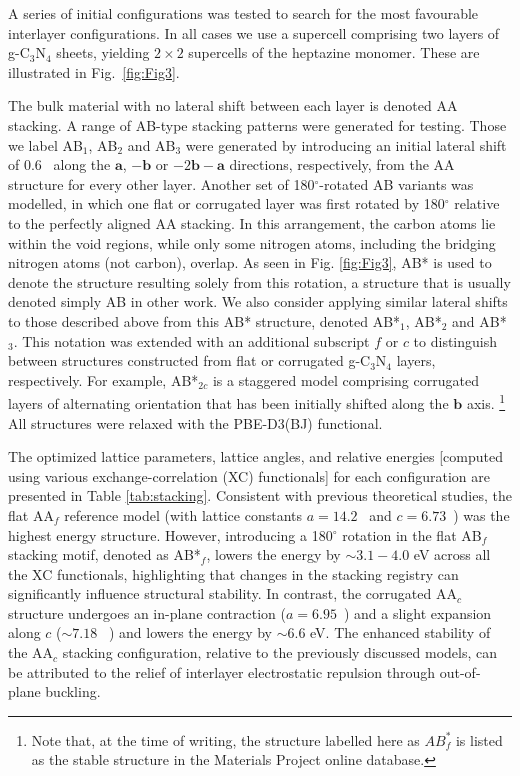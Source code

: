 A series of initial configurations was tested to search for the most favourable
interlayer configurations.  In all cases we use a supercell comprising two layers of g-C$_3$N$_4$ sheets, yielding $2 \times 2$ supercells of the heptazine monomer.  These are illustrated in Fig.\ \ref{fig:Fig3}.

The bulk material with no lateral shift between each layer is denoted AA stacking.
A range of AB-type stacking patterns were generated for testing. Those we label AB$_{1}$, AB$_{2}$ and AB$_{3}$ were generated by introducing an initial lateral shift of 0.6~\text{\AA} along the $\mathbf{a}$, $-\mathbf{b}$ or $-2\mathbf{b}-\mathbf{a}$
directions, respectively, from the AA structure for every other layer.
Another set of 180$^\circ$-rotated AB variants was modelled, in which one flat or corrugated layer was first rotated by 180$^\circ$ relative to the perfectly aligned AA stacking. In this arrangement, the carbon atoms lie within the void regions, while only some nitrogen atoms, including the bridging nitrogen atoms (not carbon), overlap. As seen in Fig. \ref{fig:Fig3}, AB* is used to denote the structure resulting solely from this rotation, a structure that is usually denoted simply AB in other work.
We also consider applying similar lateral shifts to those described above from this AB* structure, denoted AB*$_{1}$, AB*$_{2}$ and AB*$_{3}$. This notation was extended with an additional 
subscript $f$ or $c$ to distinguish between structures constructed from flat or corrugated g-C$_3$N$_4$ layers, respectively. For example, AB*$_{2c}$ is a staggered model comprising corrugated layers of alternating orientation that has been initially shifted along the $\mathbf{b}$ axis.%
\footnote{Note that, at the time of writing, the structure labelled here as $AB^*_f$ is listed as the stable structure in the Materials Project online database.}
All structures were relaxed with the PBE-D3(BJ) functional.

The optimized lattice parameters, lattice angles, and relative energies [computed using various exchange-correlation (XC) functionals] for each configuration are presented in Table \ref{tab:stacking}. 
Consistent with previous theoretical studies, \cite{Sun2018FirstArrangement,Zuluaga2015StructuralG-C3N4}
the flat AA$_f$ reference model (with lattice constants $a = 14.2$~\text{\AA} and $c = 6.73$~\text{\AA}) was the highest energy structure. 
However, introducing a 180$^\circ$ rotation in the flat AB$_f$ stacking motif, denoted as AB*$_f$, lowers the energy by $\sim3.1-4.0$ eV across all the XC functionals, highlighting that changes in the stacking registry can significantly influence structural stability. In contrast, the corrugated AA$_c$ structure undergoes an in-plane contraction ($a = 6.95$~\text{\AA}) and a slight expansion along $c$ ($\sim7.18$ ~\text{\AA}) and lowers the energy by $\sim6.6$ eV. The enhanced stability of the AA$_c$ stacking configuration, relative to the previously discussed models, can be attributed to the relief of interlayer electrostatic repulsion through out-of-plane buckling.

